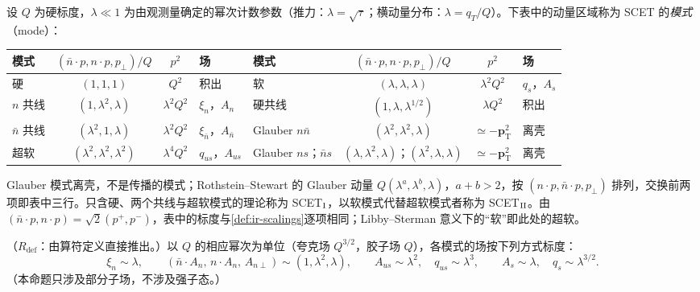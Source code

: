 \begin{definition}[模式]\label{def:scet-modes}
设 $Q$ 为硬标度，$\lambda\ll1$ 为由观测量确定的幂次计数参数（推力：$\lambda=\sqrt\tau$；横动量分布：$\lambda=q_T/Q$）。下表中的动量区域称为 SCET 的\emph{模式}（mode）：
\begin{center}\small
\renewcommand{\arraystretch}{1.1}
\begin{tabular}{@{}lccl@{\qquad}lccl@{}}
\toprule
模式 & $(\bar n\cdot p,n\cdot p,p_\perp)/Q$ & $p^2$ & 场 & 模式 & $(\bar n\cdot p,n\cdot p,p_\perp)/Q$ & $p^2$ & 场\\
\midrule
硬 & $(1,1,1)$ & $Q^2$ & 积出 & 软 & $(\lambda,\lambda,\lambda)$ & $\lambda^2Q^2$ & $q_s$，$A_s$ \\
$n$ 共线 & $(1,\lambda^2,\lambda)$ & $\lambda^2Q^2$ & $\xi_n$，$A_n$ & 硬共线 & $(1,\lambda,\lambda^{1/2})$ & $\lambda Q^2$ & 积出 \\
$\bar n$ 共线 & $(\lambda^2,1,\lambda)$ & $\lambda^2Q^2$ & $\xi_{\bar n}$，$A_{\bar n}$ & Glauber $n\bar n$ & $(\lambda^2,\lambda^2,\lambda)$ & $\simeq-\bm p_{\mathrm T}^2$ & 离壳 \\
超软 & $(\lambda^2,\lambda^2,\lambda^2)$ & $\lambda^4Q^2$ & $q_{us}$，$A_{us}$ & Glauber $ns$；$\bar ns$ & $(\lambda,\lambda^2,\lambda)$；$(\lambda^2,\lambda,\lambda)$ & $\simeq-\bm p_{\mathrm T}^2$ & 离壳 \\
\bottomrule
\end{tabular}
\end{center}
Glauber 模式离壳，不是传播的模式；Rothstein--Stewart 的 Glauber 动量 $Q(\lambda^a,\lambda^b,\lambda)$，$a+b>2$，按 $(n\cdot p,\bar n\cdot p,p_\perp)$ 排列，交换前两项即表中三行\cite[表~1]{RothsteinStewart2016}。只含硬、两个共线与超软模式的理论称为 SCET$_{\rm I}$，以软模式代替超软模式者称为 SCET$_{\rm II}$。由 $(\bar n\cdot p,n\cdot p)=\sqrt2(p^+,p^-)$，表中的标度与\cref{def:ir-scalings}逐项相同；Libby--Sterman 意义下的“软”即此处的超软。
\end{definition}

\begin{proposition}\label{prop:scet-scalings}
（$R_{\mathrm{def}}$：由算符定义直接推出。）以 $Q$ 的相应幂次为单位（夸克场 $Q^{3/2}$，胶子场 $Q$），各模式的场按下列方式标度：
\begin{equation}\label{eq:scet-fieldscaling}
\xi_n\sim\lambda,\qquad (\bar n\cdot A_n,\,n\cdot A_n,\,A_{n\perp})\sim(1,\lambda^2,\lambda),\qquad
A_{us}\sim\lambda^2,\quad q_{us}\sim\lambda^3,\qquad A_s\sim\lambda,\quad q_s\sim\lambda^{3/2}.
\end{equation}
（本命题只涉及部分子场，不涉及强子态。）
\end{proposition}

